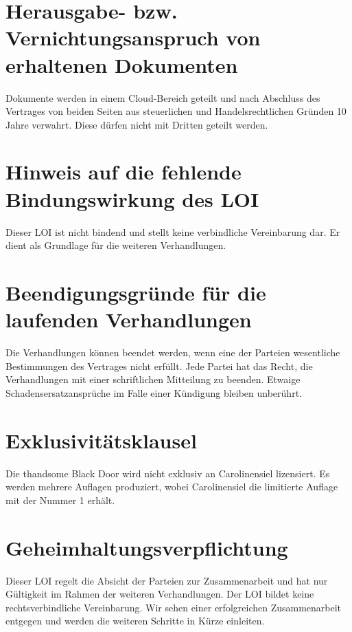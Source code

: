  
\section[erhaltene Dokumente]{Herausgabe- bzw. Vernichtungsanspruch von erhaltenen Dokumenten}

Dokumente werden in einem Cloud-Bereich geteilt und nach Abschluss des Vertrages von beiden Seiten aus steuerlichen und Handelsrechtlichen Gründen 
10 Jahre verwahrt. Diese dürfen nicht mit Dritten geteilt werden. 

  
\section[Bindungswirkung]{Hinweis auf die fehlende Bindungswirkung des LOI}
 
Dieser LOI ist nicht bindend und stellt keine verbindliche Vereinbarung dar. 
Er dient als Grundlage für die weiteren Verhandlungen. 

  
\section[Beendigungsgründe]{Beendigungsgründe für die laufenden Verhandlungen}

Die Verhandlungen können beendet werden, wenn eine der Parteien wesentliche Bestimmungen
des Vertrages nicht erfüllt. Jede Partei hat das Recht, die Verhandlungen mit einer schriftlichen Mitteilung zu beenden. 
Etwaige Schadensersatzansprüche im Falle einer Kündigung bleiben unberührt.

  
\section[Exklusivitätsklausel]{Exklusivitätsklausel}
 
Die thandsome Black Door wird nicht exklusiv an Carolinensiel lizensiert.
Es werden mehrere Auflagen produziert, wobei Carolinensiel die limitierte Auflage mit der Nummer 1 erhält. 

\newpage
\section[Geheimhaltungsverpflichtung]{Geheimhaltungsverpflichtung}

Dieser LOI regelt die Absicht der Parteien zur Zusammenarbeit und hat nur Gültigkeit im Rahmen der weiteren Verhandlungen. Der LOI bildet keine rechtsverbindliche Vereinbarung. 
Wir sehen einer erfolgreichen Zusammenarbeit entgegen und werden die weiteren Schritte in Kürze einleiten. 


